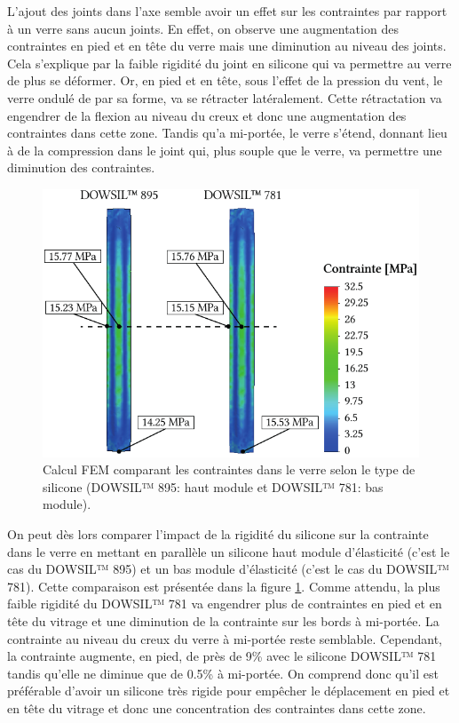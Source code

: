 \documentclass[11pt,titlepage]{article}
\begin{document}
L'ajout des joints dans l'axe semble avoir un effet sur les contraintes par rapport à un verre sans aucun joints. En effet, on observe une augmentation des contraintes en pied et en tête du verre mais une diminution au niveau des joints. Cela s'explique par la faible rigidité du joint en silicone qui va permettre au verre de plus se déformer. Or, en pied et en tête, sous l'effet de la pression du vent, le verre ondulé de par sa forme, va se rétracter latéralement. Cette rétractation va engendrer de la flexion au niveau du creux et donc une augmentation des contraintes dans cette zone. Tandis qu'a mi-portée, le verre s'étend, donnant lieu à de la compression dans le joint qui, plus souple que le verre, va permettre une diminution des contraintes. 
\newpage
\begin{figure}
\centering
\includegraphics[width=\linewidth]{img/ondul/fem/femjoint3.pdf}
\caption{Calcul \acrshort{FEM} comparant les contraintes dans le verre selon le type de silicone (DOWSIL™ 895: haut module et DOWSIL™ 781: bas module).}
\label{fig:femjoints3}
\vspace{-10pt}
\end{figure}

On peut dès lors comparer l'impact de la rigidité du silicone sur la contrainte dans le verre en mettant en parallèle un silicone haut module d'élasticité (c'est le cas du DOWSIL™ 895) et un bas module d'élasticité (c'est le cas du DOWSIL™ 781). Cette comparaison est présentée dans la figure \ref{fig:femjoints3}. 
Comme attendu, la plus faible rigidité du DOWSIL™ 781 va engendrer plus de contraintes en pied et en tête du vitrage et une diminution de la contrainte sur les bords à mi-portée. La contrainte au niveau du creux du verre à mi-portée reste semblable. Cependant, la contrainte augmente, en pied, de près de 9\% avec le silicone DOWSIL™ 781 tandis qu'elle ne diminue que de 0.5\% à mi-portée. On comprend donc qu'il est préférable d'avoir un silicone très rigide pour empêcher le déplacement en pied et en tête du vitrage et donc une concentration des contraintes dans cette zone.
\end{document}
